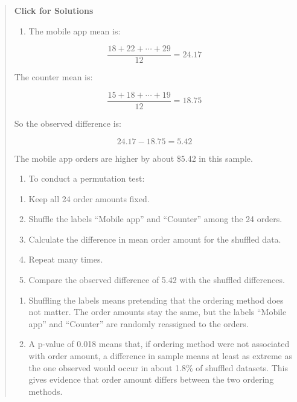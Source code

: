 \documentclass[
  letterpaper,
  DIV=11,
  numbers=noendperiod]{scrreprt}
\providecommand{\tightlist}{%
  \setlength{\itemsep}{0pt}\setlength{\parskip}{0pt}}
\begin{document}
\begin{tcolorbox}
\begin{quote}
\textbf{Click for Solutions}

\begin{enumerate}
\def\labelenumi{(\alph{enumi})}
\tightlist
\item
  The mobile app mean is:
\end{enumerate}

\[\frac{18+22+\cdots+29}{12} = 24.17\]

The counter mean is:

\[\frac{15+18+\cdots+19}{12} = 18.75\]

So the observed difference is:

\[24.17 - 18.75 = 5.42\]

The mobile app orders are higher by about \$5.42 in this sample.

\begin{enumerate}
\def\labelenumi{(\alph{enumi})}
\setcounter{enumi}{1}
\tightlist
\item
  To conduct a permutation test:
\end{enumerate}

\begin{enumerate}
\def\labelenumi{\arabic{enumi}.}
\tightlist
\item
  Keep all 24 order amounts fixed.
\item
  Shuffle the labels ``Mobile app'' and ``Counter'' among the 24 orders.
\item
  Calculate the difference in mean order amount for the shuffled data.
\item
  Repeat many times.
\item
  Compare the observed difference of 5.42 with the shuffled differences.
\end{enumerate}

\begin{enumerate}
\def\labelenumi{(\alph{enumi})}
\setcounter{enumi}{2}
\item
  Shuffling the labels means pretending that the ordering method does
  not matter. The order amounts stay the same, but the labels ``Mobile
  app'' and ``Counter'' are randomly reassigned to the orders.
\item
  A p-value of 0.018 means that, if ordering method were not associated
  with order amount, a difference in sample means at least as extreme as
  the one observed would occur in about 1.8\% of shuffled datasets. This
  gives evidence that order amount differs between the two ordering
  methods.
\end{enumerate}
\end{quote}

\end{tcolorbox}
\end{document}
